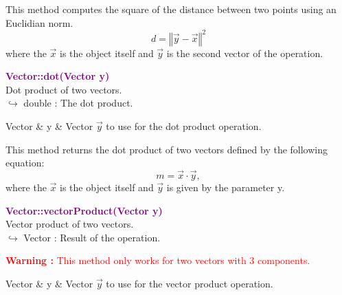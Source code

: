 This method computes the square of the distance between two points using an Euclidian norm.
\begin{equation*}
d = {\left\Vert \overrightarrow{y} - \overrightarrow{x} \right\Vert}^2
\end{equation*}
where the $\overrightarrow{x}$ is the object itself and $\overrightarrow{y}$ is the second vector of the operation.

\textcolor{purple}{\textbf{Vector::dot(Vector y)}}\label{Vector::dot(Vector y)}\\
Dot product of two vectors.\\ \hspace*{10mm}$\hookrightarrow$ double : The dot product.

\begin{tcolorbox}[width=\textwidth,myArgs,tabularx={ll|R}]
Vector & y & Vector $\overrightarrow{y}$ to use for the dot product operation.
\end{tcolorbox}

This method returns the dot product of two vectors defined by the following equation:
\begin{equation*}
m = \overrightarrow{x}\cdot\overrightarrow{y},
\end{equation*}
where the $\overrightarrow{x}$ is the object itself and $\overrightarrow{y}$ is given by the parameter y.

\textcolor{purple}{\textbf{Vector::vectorProduct(Vector y)}}\label{Vector::vectorProduct(Vector y)}\\
Vector product of two vectors.\\ \hspace*{10mm}$\hookrightarrow$ Vector : Result of the operation.

\hspace*{10mm}\textcolor{red}{\textbf{Warning :} This method only works for two vectors with 3 components.}

\begin{tcolorbox}[width=\textwidth,myArgs,tabularx={ll|R}]
Vector & y & Vector $\overrightarrow{y}$ to use for the vector product operation.
\end{tcolorbox}

